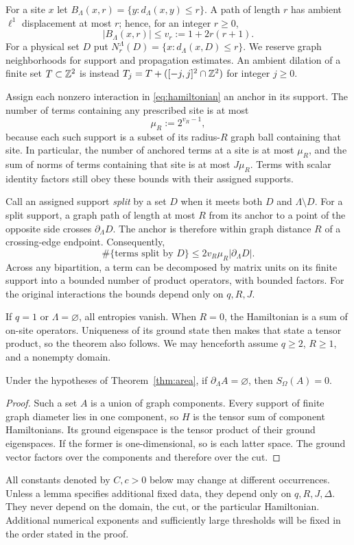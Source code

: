 For a site $x$ let $B_\Lambda(x,r)=\{y:d_\Lambda(x,y)\le r\}$.
A path of length $r$ has ambient $\ell^1$ displacement at most $r$; hence,
for an integer $r\ge0$,
\begin{equation}\label{eq:ball-count}
 |B_\Lambda(x,r)|\le v_r:=1+2r(r+1).
\end{equation}
For a physical set $D$ put
$N_r^\Lambda(D)=\{x:d_\Lambda(x,D)\le r\}$.
We reserve graph neighborhoods for support and propagation estimates.
An ambient dilation of a finite set $T\subset\mathbb Z^2$ is instead
$T_j=T+([-j,j]^2\cap\mathbb Z^2)$ for integer $j\ge0$.

Assign each nonzero interaction in \eqref{eq:hamiltonian} an anchor in its
support. The number of terms containing any prescribed site is at most
\[
 \mu_R:=2^{v_R-1},
\]
because each such support is a subset of its radius-$R$ graph ball containing
that site. In particular, the number of anchored terms at a site is at most
$\mu_R$, and the sum of norms of terms containing that site is at most
$J\mu_R$. Terms with scalar identity factors still obey these bounds with
their assigned supports.

Call an assigned support \emph{split} by a set $D$ when it meets both $D$ and
$\Lambda\setminus D$. For a split support, a graph path of length at most $R$
from its anchor to a point of the opposite side crosses $\partial_\Lambda D$.
The anchor is therefore within graph distance $R$ of a crossing-edge
endpoint. Consequently,
\begin{equation}\label{eq:crossing-count}
 \#\{\text{terms split by }D\}
 \le 2v_R\mu_R|\partial_\Lambda D|.
\end{equation}
Across any bipartition, a term can be decomposed by matrix units on its finite
support into a bounded number of product operators, with bounded factors.
For the original interactions the bounds depend only on $q,R,J$.

If $q=1$ or $\Lambda=\varnothing$, all entropies vanish. When $R=0$, the
Hamiltonian is a sum of on-site operators. Uniqueness of its ground state
then makes that state a tensor product, so the theorem also follows.
We may henceforth assume $q\ge2$, $R\ge1$, and a nonempty domain.

\begin{lemma}\label{lem:zero-boundary}
Under the hypotheses of Theorem~\ref{thm:area}, if
$\partial_\Lambda A=\varnothing$, then $S_\Omega(A)=0$.
\end{lemma}
\begin{proof}
Such a set $A$ is a union of graph components. Every support of finite graph
diameter lies in one component, so $H$ is the tensor sum of component
Hamiltonians. Its ground eigenspace is the tensor product of their ground
eigenspaces. If the former is one-dimensional, so is each latter space.
The ground vector factors over the components and therefore over the cut.
\end{proof}

All constants denoted by $C,c>0$ below may change at different occurrences.
Unless a lemma specifies additional fixed data, they depend only on
$q,R,J,\Delta$. They never depend on the domain, the cut, or the particular
Hamiltonian. Additional numerical exponents and sufficiently large thresholds
will be fixed in the order stated in the proof.
